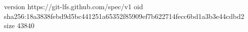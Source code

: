 version https://git-lfs.github.com/spec/v1
oid sha256:18a3838febd9d5bc441251a65352f85909ef7b622714fecc6bd1a3b3e44cdbd2
size 43840
